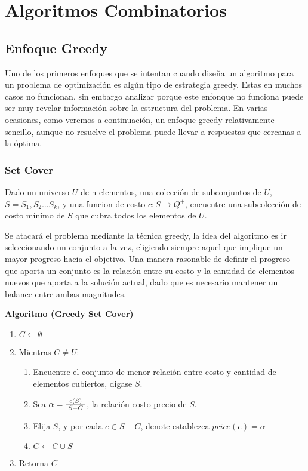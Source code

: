 \documentclass[../np-approximations.tex]{subfiles}
\begin{document}
\section{Algoritmos Combinatorios}

\subsection{Enfoque Greedy}

Uno de los primeros enfoques que se intentan cuando diseña un
algoritmo para un problema de optimización es algún tipo de 
estrategia greedy. Estas en muchos casos no funcionan, sin embargo 
analizar porque este enfonque no funciona puede ser muy revelar 
información sobre la estructura del problema. En varias ocasiones, 
como veremos a continuación, un enfoque greedy relativamente 
sencillo, aunque no resuelve el problema puede llevar a respuestas 
que cercanas a la óptima.

\subsubsection{Set Cover}

\begin{statement}
	Dado un universo $U$ de n elementos, una colección de 
	subconjuntos
	de $U$, $S={S_1, S_2 \dots S_k}$, y una funcion de costo
	$c:S \rightarrow Q^+$, encuentre una subcolección de costo
	mínimo de $S$ que cubra todos los elementos de $U$.
\end{statement}
    
Se atacará el problema mediante la técnica greedy, la idea del
algoritmo es ir seleccionando un conjunto a la vez, eligiendo 
siempre aquel que implique un mayor progreso hacia el objetivo.
Una manera rasonable de definir el progreso que aporta un conjunto  
es la relación entre su costo y la cantidad de elementos nuevos que 
aporta a la solución actual, dado que es necesario mantener un 
balance entre ambas magnitudes.
    
\bigskip
\begin{tcolorbox}
	\textbf{Algoritmo (Greedy Set Cover)}
	\begin{enumerate}
		\item $C \leftarrow \emptyset$
		\item Mientras $C \neq U$:
		      \begin{enumerate}
		      	\item Encuentre el conjunto de menor relación entre costo y cantidad de elementos cubiertos, digase $S$.
		      	\item Sea $\alpha=\frac{c(S)}{\left \vert S-C \right \vert}$, la relación costo precio de $S$.
		      	\item Elija $S$, y por cada $e\in S-C$, denote establezca $price(e)=\alpha$
		      	\item $C \leftarrow C \cup S$
		      \end{enumerate}
		\item Retorna $C$
	\end{enumerate}
\end{tcolorbox}
\bigskip
    
\end{document}
